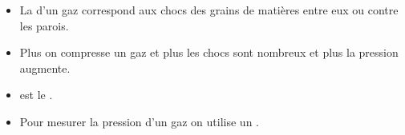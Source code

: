 \begin{mybilan}
	\begin{itemize}
		\item La  d'un gaz correspond aux chocs des grains de matières entre eux ou contre les parois.\pause
		\item Plus on compresse un gaz et plus les chocs sont nombreux et plus la pression augmente.\pause
		\item {} est le .\pause
		\item Pour mesurer la pression d'un gaz on utilise un .
		
	\end{itemize}
\end{mybilan}